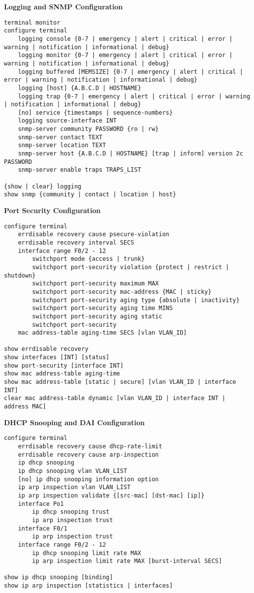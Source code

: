 \documentclass[12pt]{article}
\begin{document}
	\textbf{Logging and SNMP Configuration}
	\begin{lstlisting}
terminal monitor
configure terminal
	logging console {0-7 | emergency | alert | critical | error | warning | notification | informational | debug}
	logging monitor {0-7 | emergency | alert | critical | error | warning | notification | informational | debug}
	logging buffered [MEMSIZE] {0-7 | emergency | alert | critical | error | warning | notification | informational | debug}
	logging [host] {A.B.C.D | HOSTNAME}
	logging trap {0-7 | emergency | alert | critical | error | warning | notification | informational | debug}
	[no] service {timestamps | sequence-numbers}
	logging source-interface INT
	snmp-server community PASSWORD {ro | rw}
	snmp-server contact TEXT
	snmp-server location TEXT
	snmp-server host {A.B.C.D | HOSTNAME} [trap | inform] version 2c PASSWORD
	snmp-server enable traps TRAPS_LIST

{show | clear} logging
show snmp {community | contact | location | host}
	\end{lstlisting}

	\textbf{Port Security Configuration}
	\begin{lstlisting}
configure terminal
	errdisable recovery cause psecure-violation
	errdisable recovery interval SECS
	interface range F0/2 - 12
		switchport mode {access | trunk}
		switchport port-security violation {protect | restrict | shutdown}
		switchport port-security maximum MAX
		switchport port-security mac-address {MAC | sticky}
		switchport port-security aging type {absolute | inactivity}
		switchport port-security aging time MINS
		switchport port-security aging static
		switchport port-security
	mac address-table aging-time SECS [vlan VLAN_ID]

show errdisable recovery
show interfaces [INT] [status]
show port-security [interface INT]
show mac address-table aging-time
show mac address-table [static | secure] [vlan VLAN_ID | interface INT]
clear mac address-table dynamic [vlan VLAN_ID | interface INT | address MAC]
	\end{lstlisting}

	\textbf{DHCP Snooping and DAI Configuration}
	\begin{lstlisting}
configure terminal
	errdisable recovery cause dhcp-rate-limit
	errdisable recovery cause arp-inspection
	ip dhcp snooping
	ip dhcp snooping vlan VLAN_LIST
	[no] ip dhcp snooping information option
	ip arp inspection vlan VLAN_LIST
	ip arp inspection validate {[src-mac] [dst-mac] [ip]}
	interface Po1
		ip dhcp snooping trust
		ip arp inspection trust
	interface F0/1
		ip arp inspection trust
	interface range F0/2 - 12
		ip dhcp snooping limit rate MAX
		ip arp inspection limit rate MAX [burst-interval SECS]

show ip dhcp snooping [binding]
show ip arp inspection [statistics | interfaces]
	\end{lstlisting}
\end{document}

